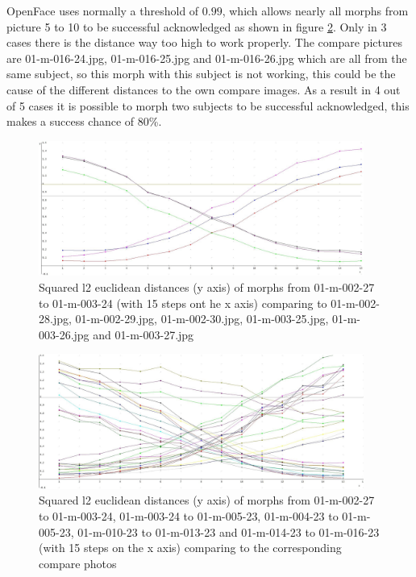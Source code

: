 OpenFace uses normally a threshold of \textbf{$0.99$}, which allows nearly all morphs from picture 5 to 10 to be successful acknowledged as shown in figure \ref{fig:Result1-5}. Only in 3 cases there is the distance way too high to work properly. The compare pictures are 01-m-016-24.jpg, 01-m-016-25.jpg and 01-m-016-26.jpg which are all from the same subject, so this morph with this subject is not working, this could be the cause of the different distances to the own compare images. As a result in 4 out of 5 cases it is possible to morph two subjects to be successful acknowledged, this makes a success chance of $80$\%.

\begin{figure}[htbp] 
	\centering
		\includegraphics[width=0.95\textwidth]{Resources/result1.jpg}
	\caption{Squared l2 euclidean distances (y axis) of morphs from 01-m-002-27 to 01-m-003-24 (with 15 steps ont he x axis) comparing to 01-m-002-28.jpg, 01-m-002-29.jpg, 01-m-002-30.jpg, 01-m-003-25.jpg, 01-m-003-26.jpg and 01-m-003-27.jpg}
	\label{fig:Result1}
\end{figure}

\begin{figure}[htbp] 
	\centering
		\includegraphics[width=0.95\textwidth]{Resources/result1-5.jpg}
	\caption{Squared l2 euclidean distances (y axis) of morphs from 01-m-002-27 to 01-m-003-24, 01-m-003-24 to 01-m-005-23, 01-m-004-23 to 01-m-005-23, 01-m-010-23 to 01-m-013-23 and 01-m-014-23 to 01-m-016-23 (with 15 steps on the x axis) comparing to the corresponding compare photos}
	\label{fig:Result1-5}
\end{figure}

